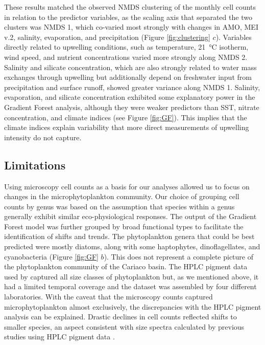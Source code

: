 \documentclass[draft]{agujournal2019}
\begin{document}
    These results matched the observed NMDS clustering of the monthly cell counts in relation to the predictor variables, as the scaling axis that separated the two clusters was NMDS 1, which co-varied most strongly with changes in AMO, MEI v.2, salinity, evaporation, and precipitation (Figure \ref{fig:clustering} $c$). Variables directly related to upwelling conditions, such as temperature, \qty{21}{\celsius} isotherm, wind speed, and nutrient concentrations varied more strongly along NMDS 2. Salinity and silicate concentration, which are also strongly related to water mass exchanges through upwelling but additionally depend on freshwater input from precipitation and surface runoff, showed greater variance along NMDS 1. Salinity, evaporation, and silicate concentration exhibited some explanatory power in the Gradient Forest analysis, although they were weaker predictors than SST, nitrate concentration, and climate indices (see Figure \ref{fig:GF}). This implies that the climate indices explain variability that more direct measurements of upwelling intensity do not capture. 
    

\subsection{Limitations}
    
    Using microscopy cell counts as a basis for our analyses allowed us to focus on changes in the microphytoplankton community. Our choice of grouping cell counts by genus was based on the assumption that species within a genus generally exhibit similar eco-physiological responses. The output of the Gradient Forest model was further grouped by broad functional types to facilitate the identification of shifts and trends. The phytoplankton genera that could be best predicted were mostly diatoms, along with some haptophytes, dinoflagellates, and cyanobacteria (Figure \ref{fig:GF} $b$). This does not represent a complete picture of the phytoplankton community of the Cariaco basin. The HPLC pigment data used by \citeauthor{pinckney_phytoplankton_2015} captured all size classes of phytoplankton but, as we mentioned above, it had a limited temporal coverage and the dataset was assembled by four different laboratories. With the caveat that the microscopy counts captured microphytoplankton almost exclusively, the discrepancies with the HPLC pigment analysis can be explained. Drastic declines in cell counts reflected shifts to smaller species, an aspect consistent with size spectra calculated by previous studies using HPLC pigment data \cite{lorenzoni_characterization_2015}.
    
\end{document}
